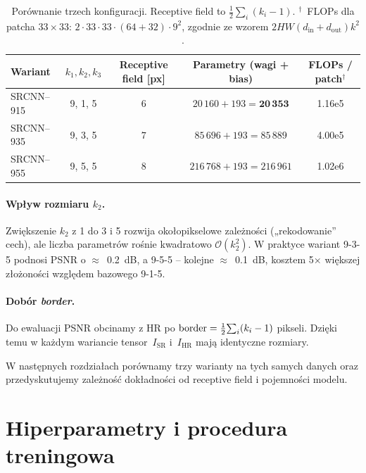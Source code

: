 \documentclass[11pt]{article}
\begin{document}
\begin{table}[h]
\centering
{}
\begin{tabular}{@{}lcccS[scientific-notation=true]@{}}
\toprule
Wariant & $k_1, k_2, k_3$ & Receptive field [px] &
Parametry (wagi + bias) & {FLOPs / patch$^\dagger$} \\
\midrule
SRCNN–915 & 9, 1, 5 & $6$ & $20\,160 + 193 = \mathbf{20\,353}$ & 1.16e5 \\
SRCNN–935 & 9, 3, 5 & $7$ & $85\,696 + 193 = 85\,889$          & 4.00e5 \\
SRCNN–955 & 9, 5, 5 & $8$ & $216\,768 + 193 = 216\,961$        & 1.02e6 \\
\bottomrule
\end{tabular}
\caption{Porównanie trzech konfiguracji. Receptive field to 
$\frac{1}{2} \sum_i (k_i - 1)$. $^\dagger$~FLOPs dla patcha 
$33 \times 33$: $2 \cdot 33 \cdot 33 \cdot (64 + 32) \cdot 9^2$, 
zgodnie ze wzorem $2HW(d_\text{in} + d_\text{out})k^2$.}
\label{tab:variants}
\end{table}

\paragraph{Wpływ rozmiaru $k_2$.}
Zwiększenie $k_2$ z 1 do 3 i 5 rozwija okołopikselowe zależności
(„rekodowanie” cech), ale liczba parametrów rośnie kwadratowo
\(\mathcal O(k_2^2)\).
W praktyce 
 wariant 9-3-5 podnosi PSNR
o \(\approx\)~\SI{0.2}{dB}, a 9-5-5 – kolejne \(\approx\)~\SI{0.1}{dB},
kosztem 5× większej złożoności względem bazowego 9-1-5.

\paragraph{Dobór \textit{border}.}
Do ewaluacji PSNR obcinamy z HR po \(\text{border}=
\smash{\tfrac12\!\sum_i(k_i-1)}\) pikseli.  
Dzięki temu w każdym wariancie tensor~\(I_\mathrm{SR}\) i \(\,
I_\mathrm{HR}\) mają identyczne rozmiary.

\bigskip
W następnych rozdziałach porównamy trzy warianty na tych samych danych
oraz przedyskutujemy zależność dokładności od receptive field
i pojemności modelu.


\newpage
\section{Hiperparametry i procedura treningowa}
\label{sec:train}
\end{document}
